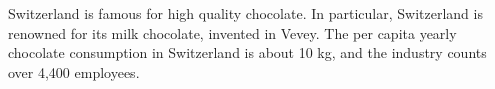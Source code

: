 Switzerland is famous for high quality chocolate.
In particular, Switzerland is renowned for its milk chocolate, invented in Vevey.
The per capita yearly chocolate consumption in Switzerland is about 10 kg, and the industry counts over 4,400 employees.
